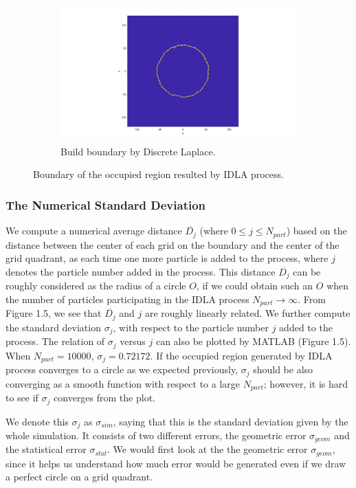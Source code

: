 \documentclass[letterpaper]{article}
\numberwithin{equation}{section} %
\numberwithin{figure}{section} %
\numberwithin{table}{section} %
\begin{document}
\begin{figure}[htbp]
\begin{subfigure}[b]{0.3\textwidth}
		\includegraphics[width=\textwidth]{3bdry3}
		\caption{Build boundary by Discrete Laplace.}
		\label{3bdry3}
	\end{subfigure}
	\caption{Boundary of the occupied region resulted by IDLA process.}
	\label{3bdry}
\end{figure}



\subsubsection{The Numerical Standard Deviation}
We compute a numerical average distance $\overline{D_j}$ (where $0 \leq j \leq N_{part}$) based on the distance between the center of each grid on the boundary and the center of the grid quadrant, as each time one more particle is added to the process, where $j$ denotes the particle number added in the process. This distance $\overline{D_j}$ can be roughly considered as the radius of a circle $O$, if we could obtain such an $O$ when the number of particles participating in the IDLA process $N_{part} \rightarrow \infty$. From Figure 1.5, we see that $\overline{D_j}$ and $j$ are roughly linearly related. We further compute the standard deviation $\sigma_j$, with respect to the particle number $j$ added to the process. The relation of $\sigma_j$ versus $j$ can also be plotted by MATLAB (Figure 1.5). When $N_{part}=10000$, $\sigma_j=0.72172$. If the occupied region generated by IDLA process converges to a circle as we expected previously, $\sigma_j$ should be also converging as a smooth function with respect to a large $N_{part}$; however, it is hard to see if $\sigma_j$ converges from the plot. 

We denote this $\sigma_j$ as $\sigma_{sim}$, saying that this is the standard deviation given by the whole simulation. It consists of two different errors, the geometric error $\sigma_{geom}$ and the statistical error $\sigma_{stat}$. We would first look at the the geometric error $\sigma_{geom}$, since it helps us understand how much error would be generated even if we draw a perfect circle on a grid quadrant.
\end{document}

